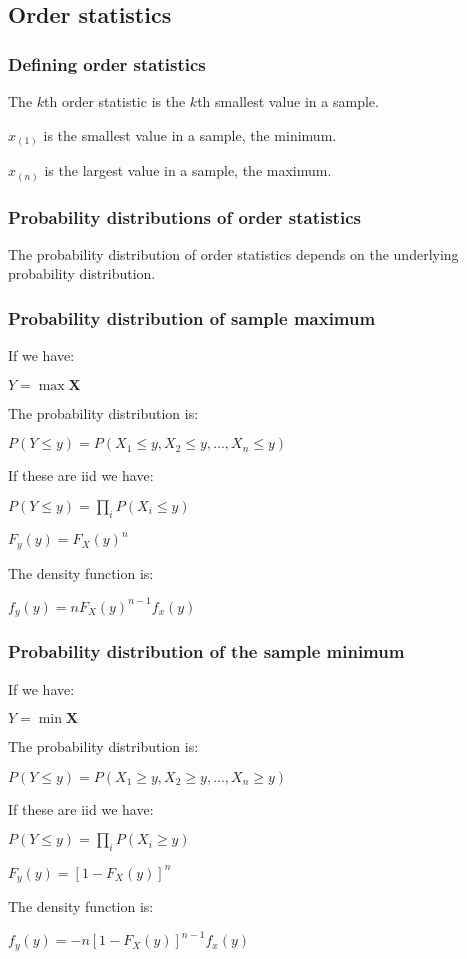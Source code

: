 
\subsection{Order statistics}

\subsubsection{Defining order statistics}

The \(k\)th order statistic is the \(k\)th smallest value in a sample.

\(x_{(1)}\) is the smallest value in a sample, the minimum.

\(x_{(n)}\) is the largest value in a sample, the maximum.

\subsubsection{Probability distributions of order statistics}

The probability distribution of order statistics depends on the underlying probability distribution.

\subsubsection{Probability distribution of sample maximum}

If we have:

\(Y=\max \mathbf X\)

The probability distribution is:

\(P(Y\le y)=P(X_1\le y, X_2\le y,...,X_n\le y)\)

If these are iid we have:

\(P(Y\le y)=\prod_i P(X_i\le y)\)

\(F_y(y)=F_X(y)^n\)

The density function is:

\(f_y(y)=nF_X(y)^{n-1}f_x(y)\)

\subsubsection{Probability distribution of the sample minimum}

If we have:

\(Y=\min \mathbf X\)

The probability distribution is:

\(P(Y\le y)=P(X_1\ge y, X_2\ge y,...,X_n\ge y)\)

If these are iid we have:

\(P(Y\le y)=\prod_i P(X_i\ge y)\)

\(F_y(y)=[1-F_X(y)]^n\)

The density function is:

\(f_y(y)=-n[1-F_X(y)]^{n-1}f_x(y)\)

